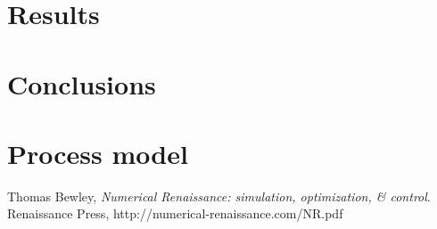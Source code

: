 \documentclass{article}
\begin{document}
\section{Results}


\afterpage{\clearpage}

\section{Conclusions}


\afterpage{\clearpage}

\appendix

\section{Process model}\label{sec:model}


\afterpage{\clearpage}

\begin{thebibliography}{9}
  Thomas Bewley,
  \emph{Numerical Renaissance: simulation, optimization, \& control}.
  Renaissance Press,
  http://numerical-renaissance.com/NR.pdf

\end{thebibliography}
\end{document}
